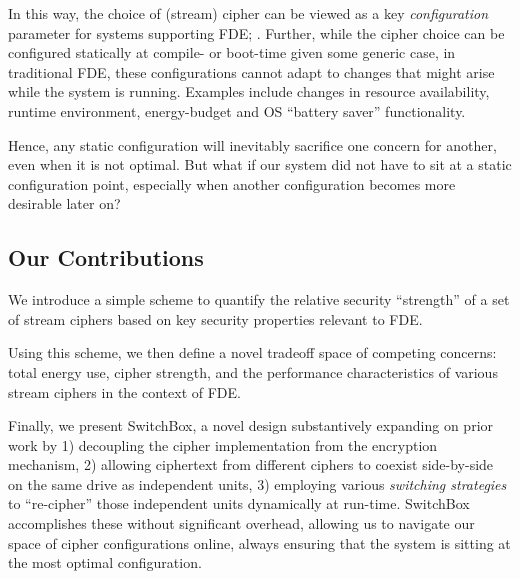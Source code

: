In this way, the choice of (stream) cipher can be viewed as a key
\emph{configuration} parameter for systems supporting FDE; . Further, while the
cipher choice can be configured statically at compile- or boot-time given some
generic case, in traditional FDE, these configurations cannot adapt to changes
that might arise while the system is running. Examples include changes in
resource availability, runtime environment, energy-budget and OS ``battery
saver'' functionality.

Hence, any static configuration will inevitably sacrifice one concern for
another, even when it is not optimal. But what if our system did not have to sit
at a static configuration point, especially when another configuration becomes
more desirable later on?

\subsection{Our Contributions}

We introduce a simple scheme to quantify the relative security ``strength'' of a
set of stream ciphers based on key security properties relevant to FDE.

Using this scheme, we then define a novel tradeoff space of competing concerns:
total energy use, cipher strength, and the performance characteristics of
various stream ciphers in the context of FDE.

Finally, we present SwitchBox, a novel design substantively expanding on prior
work by 1) decoupling the cipher implementation from the encryption mechanism,
2) allowing ciphertext from different ciphers to coexist side-by-side on the
same drive as independent units, 3) employing various \emph{switching
strategies} to ``re-cipher'' those independent units dynamically at run-time.
SwitchBox accomplishes these without significant overhead, allowing us to
navigate our space of cipher configurations online, always ensuring that the
system is sitting at the most optimal configuration.


